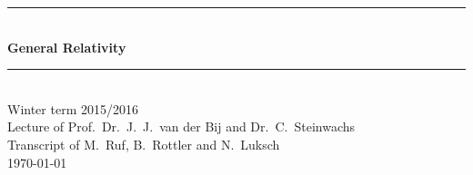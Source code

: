 \newcommand{\HRule}{\rule{\linewidth}{0.5mm}}
\begin{titlepage}
\begin{center}
  \HRule \\[0.4cm]
  { \huge \bfseries General Relativity}\\
  \HRule \\[0.5cm]
  \large Winter term 2015/2016 \\[0.5cm]  
  Lecture of Prof.\ Dr.\ J.\ J.\ van der Bij and Dr.\ C.\ Steinwachs\\
  Transcript of M.\ Ruf, B.\ Rottler and N.\ Luksch\\[1.5cm]
  \today
  \vfill
  \normalsize
   \\
   \\
\end{center}
\end{titlepage}
